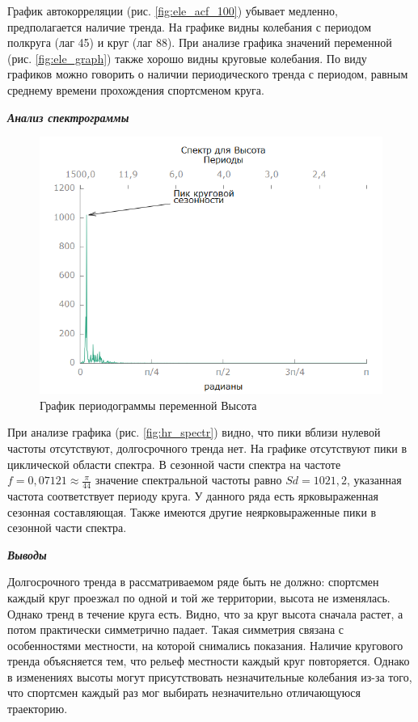 \documentclass[a4paper,12pt]{article}
\begin{document}
График автокорреляции (рис. \ref{fig:ele_acf_100}) убывает медленно, предполагается наличие тренда. На графике видны колебания с периодом полкруга (лаг 45) и круг (лаг 88). При анализе графика значений переменной (рис. \ref{fig:ele_graph}) также хорошо видны круговые колебания. По виду графиков можно говорить о наличии периодического тренда с периодом, равным среднему времени прохождения спортсменом круга.

\textbf{\textit{Анализ спектрограммы}}

\begin{figure}[H]
	\centering
	\includegraphics[width=0.7\linewidth]{../[graphics]/ele_spectr}
	\caption{График периодограммы переменной Высота}
	\label{fig:ele_spectr}
\end{figure}

При анализе графика (рис. \ref{fig:hr_spectr}) видно, что пики вблизи нулевой частоты отсутствуют, долгосрочного тренда нет. На графике отсутствуют пики в циклической области спектра. 
В сезонной части спектра на частоте $f = 0,07121 \approx \frac{\pi}{44}$ значение спектральной частоты равно $Sd = 1021,2$, указанная частота соответствует периоду круга. У данного ряда есть ярковыраженная сезонная составляющая.
Также имеются другие неярковыраженные пики в сезонной части спектра.


\textbf{\textit{Выводы}}

Долгосрочного тренда в рассматриваемом ряде быть не должно: спортсмен каждый круг проезжал по одной и той же территории, высота не изменялась. 
Однако тренд в течение круга есть. Видно, что за круг высота сначала растет, а потом практически симметрично падает. Такая симметрия связана с особенностями местности, на которой снимались показания.
Наличие кругового тренда объясняется тем, что рельеф местности каждый круг повторяется. Однако в изменениях высоты могут присутствовать незначительные колебания из-за того, что спортсмен каждый раз мог выбирать незначительно отличающуюся траекторию.
\end{document}
